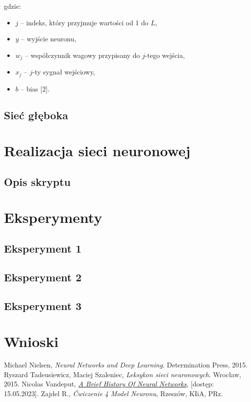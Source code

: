 \documentclass{article}
\begin{document}
gdzie:
\begin{itemize}
    \item $j$ -- indeks, który przyjmuje wartości od 1 do $L$,
    \item $y$ -- wyjście neuronu,
    \item $w_{j}$ -- współczynnik wagowy przypisany do $j$-tego wejścia,
    \item $x_{j}$ -- $j$-ty sygnał wejściowy,
    \item $b$ -- bias [2].
\end{itemize}

\subsection{Sieć głęboka}
\section{Realizacja sieci neuronowej}
\subsection{Opis skryptu}
\section{Eksperymenty}
\subsection{Eksperyment 1}
\subsection{Eksperyment 2}
\subsection{Eksperyment 3}
\section{Wnioski}
\begin{thebibliography}{9}
    Michael Nielsen,
    \emph{Neural Networks and Deep Learning}.
    Determination Press,
    2015.
    Ryszard Tadeusiewicz, Maciej Szaleniec,
    \emph{Leksykon sieci neuronowych}.
    Wrocław,
    2015.
    Nicolas Vandeput,
    \href{https://medium.com/analytics-vidhya/a-brief-history-of-neural-networks-c234639a43f1}{\emph{A Brief History Of Neural Networks}},
    [dostęp: 15.05.2023].
    Zajdel R.,
    \emph{Ćwiczenie 4 Model Neuronu},
    Rzeszów,
    KIiA, PRz.
\end{thebibliography}
\end{document}
